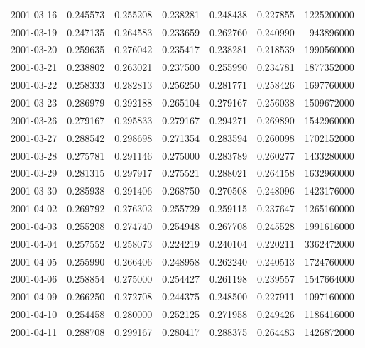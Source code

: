 \begin{tabular}{lrrrrrr}
2001-03-16 &    0.245573 &    0.255208 &    0.238281 &    0.248438 &    0.227855 &  1225200000 \\
2001-03-19 &    0.247135 &    0.264583 &    0.233659 &    0.262760 &    0.240990 &   943896000 \\
2001-03-20 &    0.259635 &    0.276042 &    0.235417 &    0.238281 &    0.218539 &  1990560000 \\
2001-03-21 &    0.238802 &    0.263021 &    0.237500 &    0.255990 &    0.234781 &  1877352000 \\
2001-03-22 &    0.258333 &    0.282813 &    0.256250 &    0.281771 &    0.258426 &  1697760000 \\
2001-03-23 &    0.286979 &    0.292188 &    0.265104 &    0.279167 &    0.256038 &  1509672000 \\
2001-03-26 &    0.279167 &    0.295833 &    0.279167 &    0.294271 &    0.269890 &  1542960000 \\
2001-03-27 &    0.288542 &    0.298698 &    0.271354 &    0.283594 &    0.260098 &  1702152000 \\
2001-03-28 &    0.275781 &    0.291146 &    0.275000 &    0.283789 &    0.260277 &  1433280000 \\
2001-03-29 &    0.281315 &    0.297917 &    0.275521 &    0.288021 &    0.264158 &  1632960000 \\
2001-03-30 &    0.285938 &    0.291406 &    0.268750 &    0.270508 &    0.248096 &  1423176000 \\
2001-04-02 &    0.269792 &    0.276302 &    0.255729 &    0.259115 &    0.237647 &  1265160000 \\
2001-04-03 &    0.255208 &    0.274740 &    0.254948 &    0.267708 &    0.245528 &  1991616000 \\
2001-04-04 &    0.257552 &    0.258073 &    0.224219 &    0.240104 &    0.220211 &  3362472000 \\
2001-04-05 &    0.255990 &    0.266406 &    0.248958 &    0.262240 &    0.240513 &  1724760000 \\
2001-04-06 &    0.258854 &    0.275000 &    0.254427 &    0.261198 &    0.239557 &  1547664000 \\
2001-04-09 &    0.266250 &    0.272708 &    0.244375 &    0.248500 &    0.227911 &  1097160000 \\
2001-04-10 &    0.254458 &    0.280000 &    0.252125 &    0.271958 &    0.249426 &  1186416000 \\
2001-04-11 &    0.288708 &    0.299167 &    0.280417 &    0.288375 &    0.264483 &  1426872000 \\

\end{tabular}
